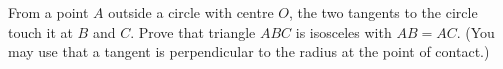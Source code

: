 From a point $A$ outside a circle with centre $O$, the two tangents to the circle touch it at $B$ and $C$. Prove that triangle $ABC$ is isosceles with $AB=AC$. (You may use that a tangent is perpendicular to the radius at the point of contact.)
